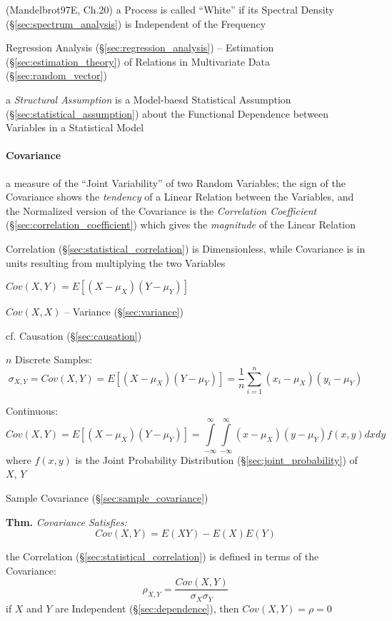 (Mandelbrot97E, Ch.20) a Process is called ``White'' if its Spectral Density
(\S\ref{sec:spectrum_analysis}) is Independent of the Frequency

\fist Regression Analysis (\S\ref{sec:regression_analysis}) -- Estimation
(\S\ref{sec:estimation_theory}) of Relations in Multivariate Data
(\S\ref{sec:random_vector})

\fist a \emph{Structural Assumption} is a Model-baesd Statistical Assumption
(\S\ref{sec:statistical_assumption}) about the Functional Dependence between
Variables in a Statistical Model



\paragraph{Covariance}\label{sec:covariance}\hfill

a measure of the ``Joint Variability'' of two Random Variables; the sign of the
Covariance shows the \emph{tendency} of a Linear Relation between the Variables,
and the Normalized version of the Covariance is the \emph{Correlation
Coefficient} (\S\ref{sec:correlation_coefficient}) which gives the
\emph{magnitude} of the Linear Relation

Correlation (\S\ref{sec:statistical_correlation}) is Dimensionless, while
Covariance is in units resulting from multiplying the two Variables

$Cov(X,Y) = E [(X - \mu_X)(Y - \mu_Y)]$

$Cov(X,X)$ -- Variance (\S\ref{sec:variance})

\fist cf. Causation (\S\ref{sec:causation})

$n$ Discrete Samples:
\[
  \sigma_{X,Y} = Cov(X,Y) = E [(X - \mu_X)(Y - \mu_Y)] =
    \frac{1}{n} \sum_{i=1}^n (x_i - \mu_X) (y_i - \mu_Y)
\]

Continuous:
\[
  Cov(X,Y) = E [(X - \mu_X)(Y - \mu_Y)] =
  \int\limits_{-\infty}^{\infty} \int\limits_{-\infty}^{\infty}
  (x - \mu_X) (y - \mu_Y) f(x,y) dx dy
\]
where $f(x,y)$ is the Joint Probability Distribution
(\S\ref{sec:joint_probability}) of $X$, $Y$

\fist Sample Covariance (\S\ref{sec:sample_covariance})

\textbf{Thm.} \emph{Covariance Satisfies:
  \[
    Cov(X,Y) = E(XY) - E(X)E(Y)
  \]
}

the Correlation (\S\ref{sec:statistical_correlation}) is defined in terms of the
Covariance:
\[
  \rho_{X,Y} = \frac{Cov(X,Y)}{\sigma_X \sigma_Y}
\]
if $X$ and $Y$ are Independent (\S\ref{sec:dependence}), then
$Cov(X,Y) = \rho = 0$

